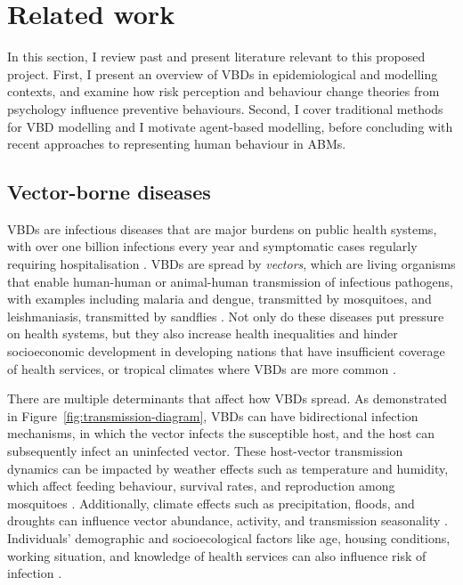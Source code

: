 
\section{Related work}

In this section, I review past and present literature relevant to this proposed project. First, I present an overview of VBDs in epidemiological and modelling contexts, and examine how risk perception and behaviour change theories from psychology influence preventive behaviours. Second, I cover traditional methods for VBD modelling and I motivate agent-based modelling, before concluding with recent approaches to representing human behaviour in ABMs.


\subsection{Vector-borne diseases}

VBDs are infectious diseases that are major burdens on public health systems, with over one billion infections every year and symptomatic cases regularly requiring hospitalisation \cite{world_health_organisation_who_global_2004}. VBDs are spread by \textit{vectors}, which are living organisms that enable human-human or animal-human transmission of infectious pathogens, with examples including malaria and dengue, transmitted by mosquitoes, and leishmaniasis, transmitted by sandflies \cite{world_health_organisation_who_vector-borne_2020}. Not only do these diseases put pressure on health systems, but they also increase health inequalities and hinder socioeconomic development in developing nations that have insufficient coverage of health services, or tropical climates where VBDs are more common \cite{campbell-lendrum_climate_2015}.

There are multiple determinants that affect how VBDs spread. As demonstrated in Figure~\ref{fig:transmission-diagram}, VBDs can have bidirectional infection mechanisms, in which the vector infects the susceptible host, and the host can subsequently infect an uninfected vector. These host-vector transmission dynamics can be impacted by weather effects such as temperature and humidity, which affect feeding behaviour, survival rates, and reproduction among mosquitoes \cite{campbell-lendrum_climate_2015}.  Additionally, climate effects such as precipitation, floods, and droughts can influence vector abundance, activity, and transmission seasonality \cite{woolhouse_early_2001}. Individuals' demographic and socioecological factors like age, housing conditions, working situation, and knowledge of health services can also influence risk of infection \cite{chala_emerging_2021, hasyim_social_2019}.

